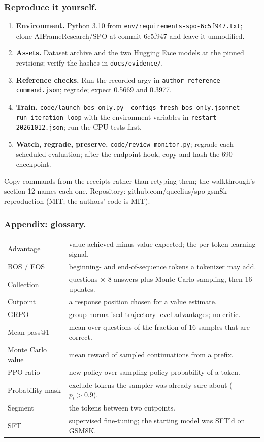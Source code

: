 \documentclass[aspectratio=169,11pt]{beamer}
\newcommand{\source}[1]{\vfill{\scriptsize\color{Gray}#1\par}}
\begin{document}
\begin{frame}[t]
\frametitle{Reproduce it yourself.}
\small
\begin{enumerate}
\item \textbf{Environment.} Python 3.10 from \texttt{env/requirements-spo-6c5f947.txt}; clone AIFrameResearch/SPO at commit 6c5f947 and leave it unmodified.
\item \textbf{Assets.} Dataset archive and the two Hugging Face models at the pinned revisions; verify the hashes in \texttt{docs/evidence/}.
\item \textbf{Reference checks.} Run the recorded argv in \texttt{author-reference-command.json}; regrade; expect 0.5669 and 0.3977.
\item \textbf{Train.} \texttt{code/launch\_bos\_only.py --configs fresh\_bos\_only.jsonnet run\_iteration\_loop} with the environment variables in \texttt{restart-20261012.json}; run the CPU tests first.
\item \textbf{Watch, regrade, preserve.} \texttt{code/review\_monitor.py}; regrade each scheduled evaluation; after the endpoint hook, copy and hash the 690 checkpoint.
\end{enumerate}
\source{Copy commands from the receipts rather than retyping them; the walkthrough's section 12 names each one. Repository: github.com/queelius/spo-gsm8k-reproduction (MIT; the authors' code is MIT).}
\end{frame}

\appendix
\begin{frame}[t]
\frametitle{Appendix: glossary.}
\small
\begin{tabular}{@{}>{\raggedright\arraybackslash}p{}>{\raggedright\arraybackslash}p{}@{}}
\toprule
Advantage & value achieved minus value expected; the per-token learning signal.\\
BOS / EOS & beginning- and end-of-sequence tokens a tokenizer may add.\\
Collection & 64 questions $\times$ 8 answers plus Monte Carlo sampling, then 16 updates.\\
Cutpoint & a response position chosen for a value estimate.\\
GRPO & group-normalised trajectory-level advantages; no critic.\\
Mean pass@1 & mean over questions of the fraction of 16 samples that are correct.\\
Monte Carlo value & mean reward of sampled continuations from a prefix.\\
PPO ratio & new-policy over sampling-policy probability of a token.\\
Probability mask & exclude tokens the sampler was already sure about ($p_t>0.9$).\\
Segment & the tokens between two cutpoints.\\
SFT & supervised fine-tuning; the starting model was SFT'd on GSM8K.\\
\bottomrule
\end{tabular}
\end{frame}
\end{document}
